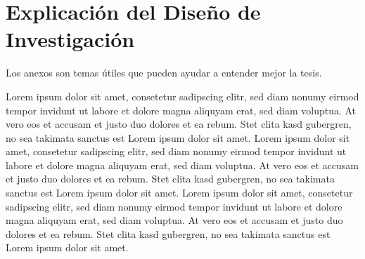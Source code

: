 \section{Explicación del Diseño de Investigación}
Los anexos son temas útiles que pueden ayudar a entender mejor la tesis.

Lorem ipsum dolor sit amet, consetetur sadipscing elitr,  sed diam nonumy eirmod
tempor invidunt ut labore et dolore magna aliquyam erat, sed diam voluptua. At
vero eos et accusam et justo duo dolores et ea rebum. Stet clita kasd gubergren,
no sea takimata sanctus est Lorem ipsum dolor sit amet. Lorem ipsum dolor sit
amet, consetetur sadipscing elitr,  sed diam nonumy eirmod tempor invidunt ut
labore et dolore magna aliquyam erat, sed diam voluptua. At vero eos et accusam
et justo duo dolores et ea rebum. Stet clita kasd gubergren, no sea takimata
sanctus est Lorem ipsum dolor sit amet. Lorem ipsum dolor sit amet, consetetur
sadipscing elitr,  sed diam nonumy eirmod tempor invidunt ut labore et dolore
magna aliquyam erat, sed diam voluptua. At vero eos et accusam et justo duo
dolores et ea rebum. Stet clita kasd gubergren, no sea takimata sanctus est
Lorem ipsum dolor sit amet.
